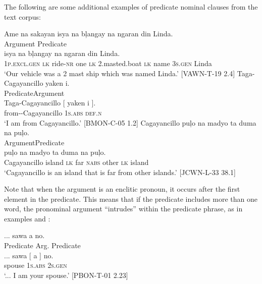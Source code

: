 The following are some additional examples of predicate nominal clauses from the text corpus:  

\newpage
\ea
Ame  na  sakayan  isya  na  bļangay  na  ngaran  din  Linda. \\\smallskip
Argument\hspace{2.7cm} Predicate \\
  isya  na  bļangay  na  ngaran  din  Linda. \\
{} 1\textsc{p.excl.gen}  \textsc{lk}  ride\textsc{-nr} {} one    \textsc{lk}  2.masted.boat  \textsc{lk}  name  3\textsc{s.gen}  Linda \\
\glt ‘Our vehicle was a 2 mast ship which was named Linda.’ [VAWN-T-19 2.4]
\z
\ea
Taga-Cagayancillo  yaken  i. \\\smallskip
Predicate\hspace{1.8cm}Argument \\
\gll Taga-Cagayancillo\footnotemark{} [  yaken  i{ }]. \\
from-{}-Cagayancillo {} 1\textsc{s.abs}  \textsc{def.n} \\
\glt ‘I am from Cagayancillo.’ [BMON-C-05 1.2]
\z
\ea
Cagayancillo  puļo  na  madyo  ta  duma  na  puļo. \\\smallskip
\hspace{.2cm}Argument\hspace{.8cm}Predicate \\
\gll [ Cagayancillo ] puļo  na  madyo  ta  duma  na  puļo{}. \\
{} Cagayancillo {} island  \textsc{lk}  far  \textsc{nabs}  other  \textsc{lk}  island \\
\glt ‘Cagayancillo is an island that is far from other islands.' [JCWN-L-33 38.1]
\z

Note that when the argument is an enclitic pronoun, it occurs after the first element in the predicate. This means that if the predicate includes more than one word, the pronominal argument “intrudes” within the predicate phrase, as in examples  and : 

\ea
\label{bkm:Ref442631395}
... sawa a no. \\\smallskip
Predicate  Arg.\hspace {.1cm} Predicate \\
\gll ... sawa   [{ }a{ }] no. \\
{}  spouse  1\textsc{s.abs} 2\textsc{s.gen} \\
\glt ‘... I am your spouse.’ [PBON-T-01 2.23]
\z


